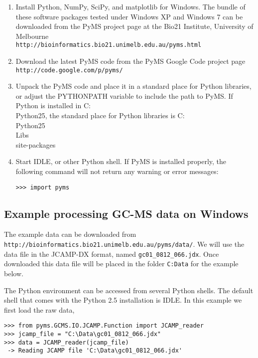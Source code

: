 \begin{enumerate}

\item Install Python, NumPy, SciPy, and matplotlib for Windows.
The bundle of these software packages tested under Windows XP and
Windows 7 can be downloaded from the PyMS project page at the
Bio21 Institute, University of Melbourne\\
{\tt http://bioinformatics.bio21.unimelb.edu.au/pyms.html}

\item Download the latest PyMS code from the PyMS Google Code
project page\\
{\tt http://code.google.com/p/pyms/}

\item Unpack the PyMS code and place it in a standard place for
Python libraries, or adjust the PYTHONPATH variable to include
the path to PyMS. If Python is installed in C:\\Python25, the
standard place for Python libraries is C:\\Python25\\Libs\\site-packages

\item Start IDLE, or other Python shell. If PyMS is installed
properly, the following command will not return any warning or
error messages:

\begin{verbatim}
>>> import pyms
\end{verbatim}

\end{enumerate}

\subsection{Example processing GC-MS data on Windows}

The example data can be downloaded from\\
{\tt http://bioinformatics.bio21.unimelb.edu.au/pyms/data/}.
We will use the data file in the JCAMP-DX format, named
{\tt gc01\_0812\_066.jdx}. Once downloaded this data file
will be placed in the folder {\tt C:Data} for the example
below.

The Python environment can be accessed from several Python
shells. The default shell that comes with the Python 2.5
installation is IDLE. In this example we first load the
raw data,

\begin{verbatim}
>>> from pyms.GCMS.IO.JCAMP.Function import JCAMP_reader
>>> jcamp_file = "C:\Data\gc01_0812_066.jdx"
>>> data = JCAMP_reader(jcamp_file)
 -> Reading JCAMP file 'C:\Data\gc01_0812_066.jdx'
\end{verbatim}

